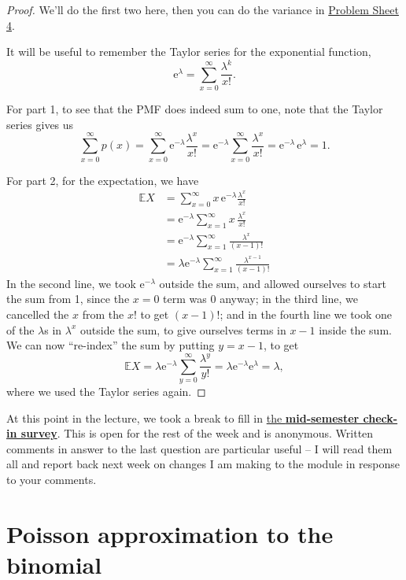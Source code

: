 \documentclass[
  a4paper,
]{book}
\theoremstyle{definition}
\theoremstyle{definition}
\theoremstyle{definition}
\theoremstyle{definition}
\theoremstyle{remark}
\begin{document}
\begin{proof}
We'll do the first two here, then you can do the variance in \protect\hyperlink{P4-long}{Problem Sheet 4}.

It will be useful to remember the Taylor series for the exponential function,
\[ \mathrm e^\lambda = \sum_{x=0}^\infty \frac{\lambda^k}{x!} . \]

For part 1, to see that the PMF does indeed sum to one, note that the Taylor series gives us
\[ \sum_{x=0}^\infty p(x) = \sum_{x=0}^\infty \mathrm e^{-\lambda} \frac{\lambda^x}{x!}
= \mathrm e^{-\lambda} \sum_{x=0}^\infty  \frac{\lambda^x}{x!} = \mathrm e^{-\lambda}\,\mathrm e^{\lambda} = 1. \]

For part 2, for the expectation, we have
\begin{align*}
\mathbb EX &= \sum_{x=0}^\infty x\,\mathrm e^{-\lambda}  \frac{\lambda^x}{x!} \\
  &= \mathrm e^{-\lambda} \sum_{x=1}^\infty x\,\frac{\lambda^x}{x!} \\
  &= \mathrm e^{-\lambda} \sum_{x=1}^\infty \frac{\lambda^x}{(x-1)!} \\
  &= \lambda \mathrm e^{-\lambda} \sum_{x=1}^\infty \frac{\lambda^{x-1}}{(x-1)!}
\end{align*}
In the second line, we took \(\mathrm e^{-\lambda}\) outside the sum, and allowed ourselves to start the sum from 1, since the \(x = 0\) term was 0 anyway; in the third line, we cancelled the \(x\) from the \(x!\) to get \((x-1)!\); and in the fourth line we took one of the \(\lambda\)s in \(\lambda^x\) outside the sum, to give ourselves terms in \(x - 1\) inside the sum. We can now ``re-index'' the sum by putting \(y = x - 1\), to get
\[ \mathbb EX = \lambda \mathrm e^{-\lambda} \sum_{y=0}^\infty \frac{\lambda^{y}}{y!}
= \lambda \mathrm e^{-\lambda} \mathrm e^{\lambda} = \lambda , \]
where we used the Taylor series again.
\end{proof}

At this point in the lecture, we took a break to fill in \href{https://forms.office.com/Pages/ResponsePage.aspx?id=qO3qvR3IzkWGPlIypTW3ywARQdZlKXRHsLcXi_ngX8NUNkoxWUlTSTBXQUVSUThGU0pXOTMwTjA0UC4u}{the \textbf{mid-semester check-in survey}}. This is open for the rest of the week and is anonymous. Written comments in answer to the last question are particular useful -- I will read them all and report back next week on changes I am making to the module in response to your comments.

\hypertarget{poisson-approx}{%
\section{Poisson approximation to the binomial}\label{poisson-approx}}
\end{document}
